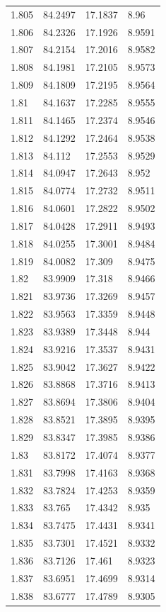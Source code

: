 \begin{tabular}{llll}
1.805 & 84.2497 & 17.1837 & 8.96 \\
1.806 & 84.2326 & 17.1926 & 8.9591 \\
1.807 & 84.2154 & 17.2016 & 8.9582 \\
1.808 & 84.1981 & 17.2105 & 8.9573 \\
1.809 & 84.1809 & 17.2195 & 8.9564 \\
1.81 & 84.1637 & 17.2285 & 8.9555 \\
1.811 & 84.1465 & 17.2374 & 8.9546 \\
1.812 & 84.1292 & 17.2464 & 8.9538 \\
1.813 & 84.112 & 17.2553 & 8.9529 \\
1.814 & 84.0947 & 17.2643 & 8.952 \\
1.815 & 84.0774 & 17.2732 & 8.9511 \\
1.816 & 84.0601 & 17.2822 & 8.9502 \\
1.817 & 84.0428 & 17.2911 & 8.9493 \\
1.818 & 84.0255 & 17.3001 & 8.9484 \\
1.819 & 84.0082 & 17.309 & 8.9475 \\
1.82 & 83.9909 & 17.318 & 8.9466 \\
1.821 & 83.9736 & 17.3269 & 8.9457 \\
1.822 & 83.9563 & 17.3359 & 8.9448 \\
1.823 & 83.9389 & 17.3448 & 8.944 \\
1.824 & 83.9216 & 17.3537 & 8.9431 \\
1.825 & 83.9042 & 17.3627 & 8.9422 \\
1.826 & 83.8868 & 17.3716 & 8.9413 \\
1.827 & 83.8694 & 17.3806 & 8.9404 \\
1.828 & 83.8521 & 17.3895 & 8.9395 \\
1.829 & 83.8347 & 17.3985 & 8.9386 \\
1.83 & 83.8172 & 17.4074 & 8.9377 \\
1.831 & 83.7998 & 17.4163 & 8.9368 \\
1.832 & 83.7824 & 17.4253 & 8.9359 \\
1.833 & 83.765 & 17.4342 & 8.935 \\
1.834 & 83.7475 & 17.4431 & 8.9341 \\
1.835 & 83.7301 & 17.4521 & 8.9332 \\
1.836 & 83.7126 & 17.461 & 8.9323 \\
1.837 & 83.6951 & 17.4699 & 8.9314 \\
1.838 & 83.6777 & 17.4789 & 8.9305 \\

\end{tabular}
